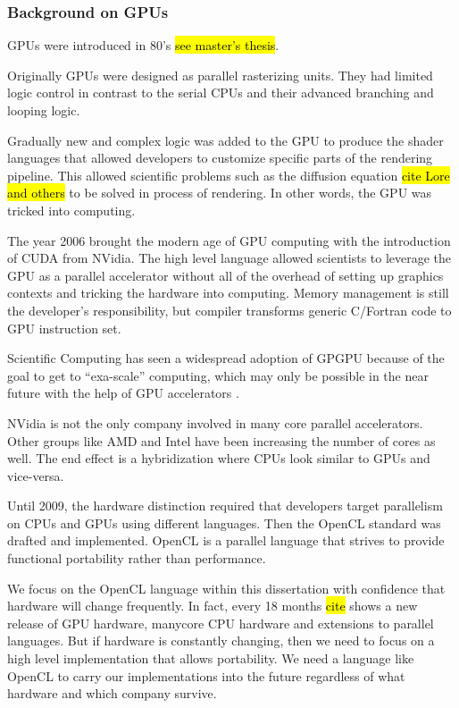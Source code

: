 \documentclass[11pt]{report}
\begin{document}
\subsubsection{Background on GPUs} 


GPUs were introduced in 80's \hl{see master's thesis}.

Originally GPUs were designed as parallel rasterizing units. They had limited logic control in contrast to the serial CPUs and their advanced branching and looping logic. 

Gradually new and complex logic was added to the GPU to produce the shader languages that allowed developers to customize specific parts of the rendering pipeline. This allowed scientific problems such as the diffusion equation \hl{cite Lore and others} to be solved in process of rendering. In other words, the GPU was tricked into computing.

The year 2006 brought the modern age of GPU computing with the introduction of CUDA from NVidia. The high level language allowed scientists to leverage the GPU as a parallel accelerator without all of the overhead of setting up graphics contexts and tricking the hardware into computing. Memory management is still the developer's responsibility, but compiler transforms generic C/Fortran code to GPU instruction set. 

Scientific Computing has seen a widespread adoption of GPGPU because of the goal to get to ``exa-scale'' computing, which may only be possible in the near future with the help of GPU accelerators \cite{GPUandExascale2011}. 

NVidia is not the only company involved in many core parallel accelerators. Other groups like AMD and Intel have been increasing the number of cores as well. The end effect is a hybridization where CPUs look similar to GPUs and vice-versa. 

Until 2009, the hardware distinction required that developers target parallelism on CPUs and GPUs using different languages. Then the OpenCL standard was drafted and implemented. OpenCL is a parallel language that strives to provide functional portability rather than performance. 

We focus on the OpenCL language within this dissertation with confidence that hardware will change frequently. In fact, every 18 months \hl{cite} shows a new release of GPU hardware, manycore CPU hardware and extensions to parallel languages. But if hardware is constantly changing, then we need to focus on a high level implementation that allows portability. We need a language like OpenCL to carry our implementations into the future regardless of what hardware and which company survive. 
\end{document}
